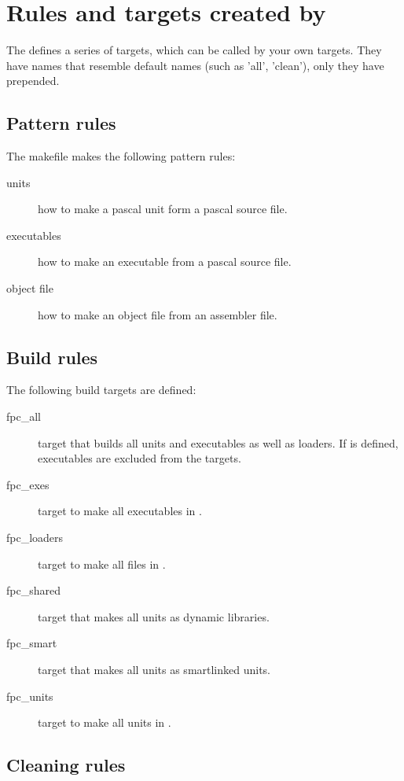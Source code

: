 \section{Rules and targets created by }

The  defines a series of targets, which can be called by
your own targets. They have names that resemble default names (such as
'all', 'clean'), only they have  prepended.

\subsection{Pattern rules}

The makefile makes the following pattern rules:
\begin{description}
\item[units] how to make a pascal unit form a pascal source file.
\item[executables] how to make an executable from a pascal source file.
\item[object file] how to make an object file from an assembler file.
\end{description}

\subsection{Build rules}

The following build targets are defined:
\begin{description}
\item[fpc\_all] target that builds all units and executables as well as
loaders. If  is defined, executables are excluded from the
targets.
\item[fpc\_exes] target to make all executables in .
\item[fpc\_loaders] target to make all files in .
\item[fpc\_shared] target that makes all units as dynamic libraries.
\item[fpc\_smart] target that makes all units as smartlinked units.
\item[fpc\_units] target to make all units in .
\end{description}

\subsection{Cleaning rules}

